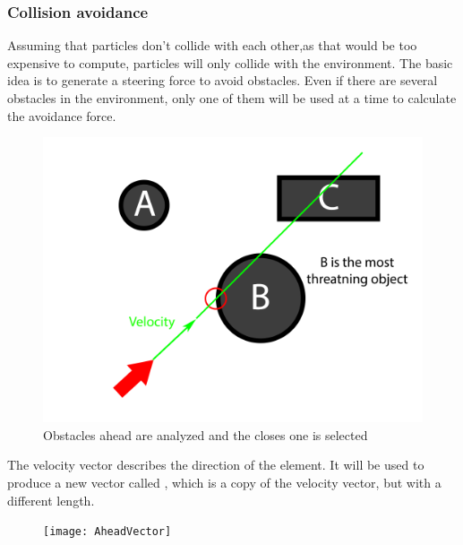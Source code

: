 \subsubsection{Collision avoidance}
Assuming that particles don't collide with each other,as that would be too expensive to compute, particles will only collide with the environment. The basic idea is to generate a steering force to avoid obstacles. Even if there are several obstacles in the environment, only one of them will be used at a time to calculate the avoidance force.
\begin{figure}
	\includegraphics{CollisionAvoidanceBasis}
	\caption{Obstacles ahead are analyzed and the closes one is selected}
	\label{fig:four}
\end{figure}
The velocity vector  describes the direction of the element. It will be used to produce a new vector called , which is a copy of the velocity vector, but with a different length.\\
\begin{figure}
	\texttt{[image: AheadVector]}
	\caption{}
	\label{fig:five}
\end{figure}
